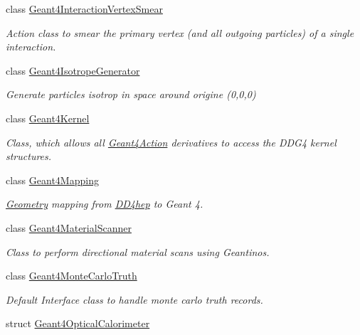 \begin{DoxyCompactItemize}
class \hyperlink{class_d_d4hep_1_1_simulation_1_1_geant4_interaction_vertex_smear}{Geant4\+Interaction\+Vertex\+Smear}
\begin{DoxyCompactList}\small\item\em Action class to smear the primary vertex (and all outgoing particles) of a single interaction. \end{DoxyCompactList}\item 
class \hyperlink{class_d_d4hep_1_1_simulation_1_1_geant4_isotrope_generator}{Geant4\+Isotrope\+Generator}
\begin{DoxyCompactList}\small\item\em Generate particles isotrop in space around origine (0,0,0) \end{DoxyCompactList}\item 
class \hyperlink{class_d_d4hep_1_1_simulation_1_1_geant4_kernel}{Geant4\+Kernel}
\begin{DoxyCompactList}\small\item\em Class, which allows all \hyperlink{class_d_d4hep_1_1_simulation_1_1_geant4_action}{Geant4\+Action} derivatives to access the D\+D\+G4 kernel structures. \end{DoxyCompactList}\item 
class \hyperlink{class_d_d4hep_1_1_simulation_1_1_geant4_mapping}{Geant4\+Mapping}
\begin{DoxyCompactList}\small\item\em \hyperlink{namespace_d_d4hep_1_1_geometry}{Geometry} mapping from \hyperlink{namespace_d_d4hep}{D\+D4hep} to Geant 4. \end{DoxyCompactList}\item 
class \hyperlink{class_d_d4hep_1_1_simulation_1_1_geant4_material_scanner}{Geant4\+Material\+Scanner}
\begin{DoxyCompactList}\small\item\em Class to perform directional material scans using Geantinos. \end{DoxyCompactList}\item 
class \hyperlink{class_d_d4hep_1_1_simulation_1_1_geant4_monte_carlo_truth}{Geant4\+Monte\+Carlo\+Truth}
\begin{DoxyCompactList}\small\item\em Default Interface class to handle monte carlo truth records. \end{DoxyCompactList}\item 
struct \hyperlink{struct_d_d4hep_1_1_simulation_1_1_geant4_optical_calorimeter}{Geant4\+Optical\+Calorimeter}

\end{DoxyCompactItemize}
